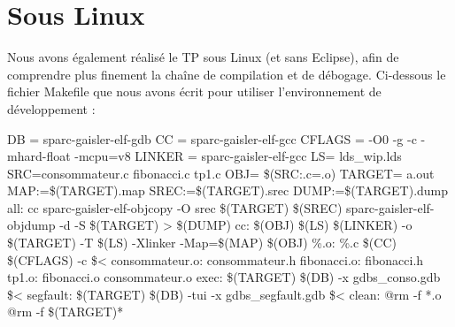 \documentclass[12pt,a4paper]{article}
\begin{document}
  \section{Sous Linux}
  Nous avons également réalisé le TP sous Linux (et sans Eclipse), afin de comprendre plus finement la chaîne de compilation et de débogage. Ci-dessous le fichier Makefile que nous avons écrit pour utiliser l'environnement de développement :
  \begin{framed}
   {\selectfont
  \noindent
DB = sparc-gaisler-elf-gdb \newline
CC = sparc-gaisler-elf-gcc \newline
CFLAGS = -O0 -g -c -mhard-float -mcpu=v8 \newline
LINKER = sparc-gaisler-elf-gcc \newline
LS= lds\_wip.lds \newline
SRC=consommateur.c fibonacci.c tp1.c \newline
OBJ= \$(SRC:.c=.o) \newline
TARGET= a.out \newline
MAP:=\$(TARGET).map \newline
SREC:=\$(TARGET).srec \newline
DUMP:=\$(TARGET).dump \newline
 \newline
all: cc \newline
	sparc-gaisler-elf-objcopy -O srec \$(TARGET) \$(SREC) \newline
	sparc-gaisler-elf-objdump -d -S \$(TARGET) > \$(DUMP) \newline
 \newline
cc: \$(OBJ) \$(LS) \newline
	\$(LINKER) -o \$(TARGET) -T \$(LS) -Xlinker -Map=\$(MAP) \$(OBJ) \newline
 \newline
\%.o: \%.c \newline
	\$(CC) \$(CFLAGS) -c \$< \newline
 \newline
consommateur.o: consommateur.h \newline
fibonacci.o: fibonacci.h \newline
tp1.o: fibonacci.o consommateur.o \newline
 \newline
exec: \$(TARGET) \newline
	\$(DB) -x gdbs\_conso.gdb \$< \newline
 \newline
segfault: \$(TARGET) \newline
	\$(DB) -tui -x gdbs\_segfault.gdb \$< \newline
 \newline
clean: \newline
	@rm -f *.o \newline
	@rm -f \$(TARGET)* \newline
	
	}
  \end{framed}
\end{document}
